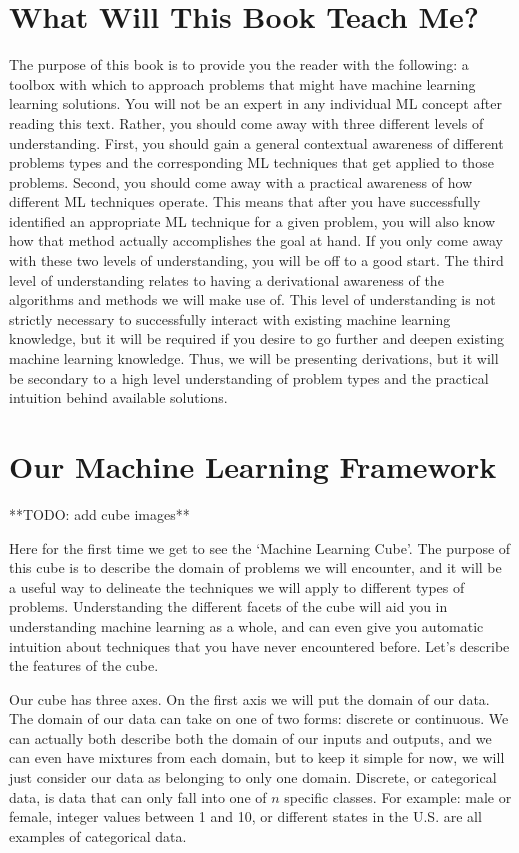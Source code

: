 \section{What Will This Book Teach Me?}
The purpose of this book is to provide you the reader with the following: a toolbox with which to approach problems that might have machine learning learning solutions. You will not be an expert in any individual ML concept after reading this text. Rather, you should come away with three different levels of understanding. First, you should gain a general contextual awareness of different problems types and the corresponding ML techniques that get applied to those problems. Second, you should come away with a practical awareness of how different ML techniques operate. This means that after you have successfully identified an appropriate ML technique for a given problem, you will also know how that method actually accomplishes the goal at hand. If you only come away with these two levels of understanding, you will be off to a good start. The third level of understanding relates to having a derivational awareness of the algorithms and methods we will make use of. This level of understanding is not strictly necessary to successfully interact with existing machine learning knowledge, but it will be required if you desire to go further and deepen existing machine learning knowledge. Thus, we will be presenting derivations, but it will be secondary to a high level understanding of problem types and the practical intuition behind available solutions.

\section{Our Machine Learning Framework}
**TODO: add cube images**

Here for the first time we get to see the `Machine Learning Cube'. The purpose of this cube is to describe the domain of problems we will encounter, and it will be a useful way to delineate the techniques we will apply to different types of problems. Understanding the different facets of the cube will aid you in understanding machine learning as a whole, and can even give you automatic intuition about techniques that you have never encountered before. Let's describe the features of the cube.

Our cube has three axes. On the first axis we will put the domain of our data. The domain of our data can take on one of two forms: discrete or continuous. We can actually both describe both the domain of our inputs and outputs, and we can even have mixtures from each domain, but to keep it simple for now, we will just consider our data as belonging to only one domain. Discrete, or categorical data, is data that can only fall into one of $n$ specific classes. For example: male or female, integer values between 1 and 10, or different states in the U.S. are all examples of categorical data.

